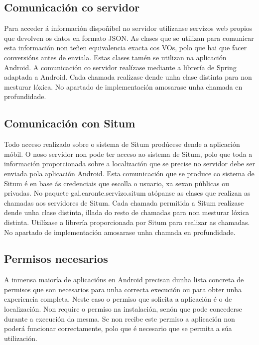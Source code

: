 \subsection{Comunicación co servidor}
Para acceder á información dispoñíbel no servidor utilízanse servizos web propios que devolven os datos en formato JSON. As clases que se utilizan para comunicar esta información non teñen equivalencia exacta cos VOs, polo que hai que facer conversións antes de enviala. Estas clases tamén se utilizan na aplicación Android.
A comunicación co servidor realízase mediante a librería de Spring adaptada a Android. Cada chamada realízase dende unha clase distinta para non mesturar lóxica.
No apartado de implementación amosarase unha chamada en profundidade.


\subsection{Comunicación con Situm}
Todo acceso realizado sobre o sistema de Situm prodúcese dende a aplicación móbil. O noso servidor non pode ter acceso ao sistema de Situm, polo que toda a información proporcionada sobre a localización que se precise no servidor debe ser enviada pola aplicación Android. Esta comunicación que se produce co sistema de Situm é en base ás credenciais que escolla o usuario, xa sexan públicas ou privadas.
No paquete gal.caronte.servizo.situm atópanse as clases que realizan as chamadas aos servidores de Situm. Cada chamada permitida a Situm realízase dende unha clase distinta, illada do resto de chamadas para non mesturar lóxica distinta.
Utilízase a librería proporcionada por Situm para realizar as chamadas. No apartado de implementación amosarase unha chamada en profundidade.

\subsection{Permisos necesarios}
A inmensa maioría de aplicacións en Android precisan dunha lista concreta de permisos que son necesarios para unha correcta execución ou para obter unha experiencia completa. Neste caso o permiso que solicita a aplicación é o de localización. Non require o permiso na instalación, senón que pode concederse durante a execución da mesma. Se non recibe este permiso a aplicación non poderá funcionar correctamente, polo que é necesario que se permita a súa utilización.


